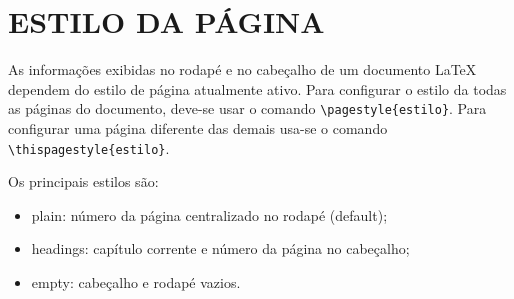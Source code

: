 \chapter{ESTILO DA PÁGINA}

As informações exibidas no rodapé e no cabeçalho de um documento \LaTeX{} dependem do estilo de página atualmente ativo.
Para configurar o estilo da todas as páginas do documento, deve-se usar o comando \verb|\pagestyle{estilo}|.
Para configurar uma página diferente das demais usa-se o comando \verb|\thispagestyle{estilo}|.

Os principais estilos são: \\

 \begin{itemize}
    \item plain: número da página centralizado no rodapé (default);
    \item headings: capítulo corrente e número da página no cabeçalho;
    \item empty: cabeçalho e rodapé vazios.
\end{itemize}
